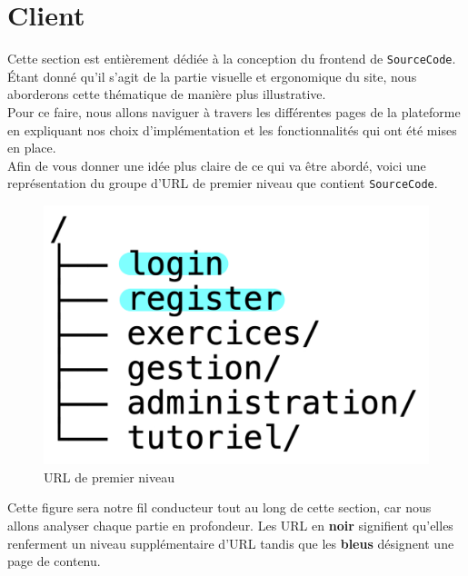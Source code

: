 \section{Client}
\label{chapter:client}

Cette section est entièrement dédiée à la conception du \gls{frontend} de \texttt{SourceCode}. Étant donné qu'il s'agit de la partie visuelle et ergonomique du site, nous aborderons cette thématique de manière plus illustrative.\\

Pour ce faire, nous allons naviguer à travers les différentes pages de la plateforme en expliquant nos choix d'implémentation et les fonctionnalités qui ont été mises en place.\\

Afin de vous donner une idée plus claire de ce qui va être abordé, voici une représentation du groupe d'URL de premier niveau que contient \texttt{SourceCode}.\\

\begin{figure}[H]
    \includegraphics[width=\textwidth,height=0.15\textheight,keepaspectratio]{images/client/overview_client.jpeg}
    \centering
    \caption[SourceCode : Représentation des URL de premier niveau]{URL de premier niveau}
\end{figure}

Cette figure sera notre fil conducteur tout au long de cette section, car nous allons analyser chaque partie en profondeur. 
Les URL en \textbf{noir} signifient qu'elles renferment un niveau supplémentaire d'URL tandis que les \textbf{bleus} désignent une page de contenu.\\

